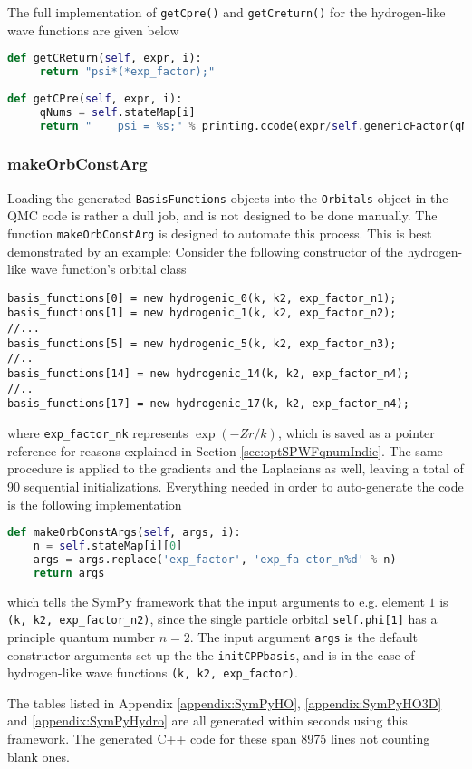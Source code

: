 The full implementation of \verb+getCpre()+ and \verb+getCreturn()+ for the hydrogen-like wave functions are given below

\vspace{0.5cm}
\begin{lstlisting}[language=Python, otherkeywords={self}]
def getCReturn(self, expr, i):
     return "psi*(*exp_factor);" 
     
def getCPre(self, expr, i):
     qNums = self.stateMap[i]
     return "    psi = %s;" % printing.ccode(expr/self.genericFactor(qNums))
\end{lstlisting}



\subsubsection{makeOrbConstArg}

Loading the generated \verb+BasisFunctions+ objects into the \verb+Orbitals+ object in the QMC code is rather a dull job, and is not designed to be done manually. The function \verb+makeOrbConstArg+ is designed to automate this process. This is best demonstrated by an example: Consider the following constructor of the hydrogen-like wave function's orbital class

\vspace{0.5cm}
\begin{lstlisting}
basis_functions[0] = new hydrogenic_0(k, k2, exp_factor_n1);
basis_functions[1] = new hydrogenic_1(k, k2, exp_factor_n2);
//...
basis_functions[5] = new hydrogenic_5(k, k2, exp_factor_n3);
//..
basis_functions[14] = new hydrogenic_14(k, k2, exp_factor_n4);
//..
basis_functions[17] = new hydrogenic_17(k, k2, exp_factor_n4);
\end{lstlisting}

where \verb+exp_factor_nk+ represents $\exp(-Zr/k)$, which is saved as a pointer reference for reasons explained in Section \ref{sec:optSPWFqnumIndie}. The same procedure is applied to the gradients and the Laplacians as well, leaving a total of 90 sequential initializations. Everything needed in order to auto-generate the code is the following implementation

\vspace{0.5cm}
\begin{lstlisting}[language=Python, otherkeywords={self}]
def makeOrbConstArgs(self, args, i):
    n = self.stateMap[i][0]
    args = args.replace('exp_factor', 'exp_fa-ctor_n%d' % n)
    return args
\end{lstlisting}

which tells the SymPy framework that the input arguments to e.g. element $1$ is \verb+(k, k2, exp_factor_n2)+, since the single particle orbital \verb+self.phi[1]+ has a principle quantum number $n=2$. The input argument \verb+args+ is the default constructor arguments set up the the \verb+initCPPbasis+, and is in the case of hydrogen-like wave functions \verb+(k, k2, exp_factor)+.

The tables listed in Appendix \ref{appendix:SymPyHO}, \ref{appendix:SymPyHO3D} and \ref{appendix:SymPyHydro} are all generated within seconds using this framework. The generated C++ code for these span 8975 lines not counting blank ones.